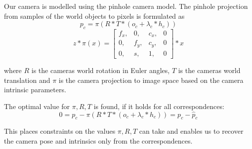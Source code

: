 Our camera is modelled using the pinhole camera model. 
The pinhole projection from samples of the world objects to pixels is formulated as
\begin{equation}
  \label{eq:static_calibration_reprojection}
  p_c = \pi \left(  
    R * T *
    (o_c + \lambda_c * h_c)
  \right)
\end{equation}
\begin{equation}
  \label{eq:static_calibration_intrinsic_parameters}
  z * \pi(x) =   
  \begin{bmatrix}
    f_x,& 0,& c_x,& 0\\
    0,& f_y,& c_y,& 0\\
    0,& s,& 1 ,& 0
  \end{bmatrix} * x 
\end{equation}

where $R$ is the cameras world rotation in Euler angles, $T$ is the cameras world translation and $\pi$ is the camera projection to image space based on the camera intrinsic parameters.

The optimal value for $\pi,R,T$ is found, if it holds for all correspondences:
\begin{equation}
  0 = p_c - \pi \left( R * T * (o_c + \lambda_c * h_c)\right) = p_c - \hat{p}_c
\end{equation}

This places constraints on the values $\pi,R,T$ can take and enables us to recover the camera pose and intrinsics only from the correspondences.


